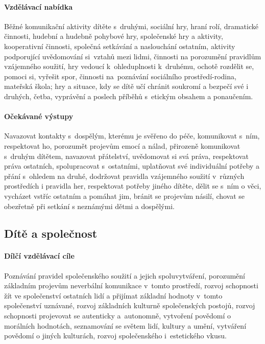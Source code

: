 					\paragraph{Vzdělávací nabídka}
						Běžné komunikační aktivity dítěte s druhými, sociální hry, hraní rolí, dramatické činnosti, hudební a hudebně pohybové hry, společenské hry a aktivity, kooperativní činnosti, společná setkávání a naslouchání ostatním, aktivity podporující uvědomování si vztahů mezi lidmi, činnosti na porozumění pravidlům vzájemného soužití, hry vedoucí k ohleduplnosti k druhému, ochotě rozdělit se, pomoci si, vyřešit spor, činnosti na poznávání sociálního prostředí-rodina, mateřská škola; hry a situace, kdy se dítě učí chránit soukromí a bezpečí své i druhých, četba, vyprávění a poslech příběhů s etickým obsahem a ponaučením.
					\paragraph{Očekávané výstupy}
						Navazovat kontakty s dospělým, kterému je svěřeno do péče, komunikovat s ním, respektovat ho, porozumět projevům emocí a nálad, přirozeně komunikovat s druhým dítětem, navazovat přátelství, uvědomovat si svá práva, respektovat práva ostatních, spolupracovat s ostatními, uplatňovat své individuální potřeby a přání s ohledem na druhé, dodržovat pravidla vzájemného soužití v různých prostředích i pravidla her, respektovat potřeby jiného dítěte, dělit se s ním o věci, vycházet vstříc ostatním a pomáhat jim, bránit se projevům násilí, chovat se obezřetně při setkání s neznámými dětmi a dospělými.

			\subsection{Dítě a společnost}
				\textit{} \citep[s.~26]{RVP}
					\paragraph{Dílčí vzdělávací cíle}
						Poznávání pravidel společenského soužití a jejich spoluvytváření, porozumění základním projevům neverbální komunikace v tomto prostředí, rozvoj schopnosti žít ve společenství ostatních lidí a přijímat základní hodnoty v tomto společenství uznávané, rozvoj základních kulturně společenských postojů, rozvoj schopnosti projevovat se autenticky a autonomně, vytvoření povědomí o morálních hodnotách, seznamování se světem lidí, kultury a umění, vytváření povědomí o jiných kulturách, rozvoj společenského i estetického vkusu.
